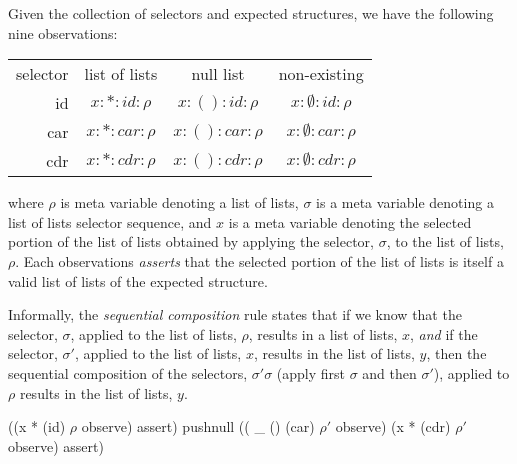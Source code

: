 \documentclass[a4paper,openany]{amsart}
\begin{document}
Given the collection of selectors and expected structures, we have the following
nine observations:
%
\vspace{1ex}\begin{center}\begin{tabular}{rccc}
selector & list of lists    &    null list       &   non-existing \\
id       & $x : * : id  : \rho$ & $x : ( ) : id  : \rho$ & $x : \emptyset : id  : \rho$ \\
car      & $x : * : car : \rho$ & $x : ( ) : car : \rho$ & $x : \emptyset : car : \rho$ \\
cdr      & $x : * : cdr : \rho$ & $x : ( ) : cdr : \rho$ & $x : \emptyset : cdr : \rho$
\end{tabular}\end{center}\vspace{1ex}
%
where $\rho$ is meta variable denoting a list of lists, $\sigma$ is a meta
variable denoting a list of lists selector sequence, and $x$ is a meta variable
denoting the selected portion of the list of lists obtained by applying the
selector, $\sigma$, to the list of lists, $\rho$. Each observations
\emph{asserts} that the selected portion of the list of lists is itself a valid
list of lists of the expected structure.

\begin{prooftree}
\end{prooftree}

Informally, the \emph{sequential composition} rule states that if we know that
the selector, $\sigma$, applied to the list of lists, $\rho$, results in a list
of lists, $x$, \emph{and} if the selector, $\sigma'$, applied to the list of
lists, $x$, results in the list of lists, $y$, then the sequential composition
of the selectors, $\sigma' \sigma$ (apply first $\sigma$ and then $\sigma'$),
applied to $\rho$ results in the list of lists, $y$.

\begin{prooftree}
\end{prooftree}

\begin{racket}
((x * (id) $\rho$ observe) assert)
pushnull
(( _ () (car) $\rho'$ observe) (x * (cdr) $\rho'$ observe) assert)
\end{racket}
\end{document}
